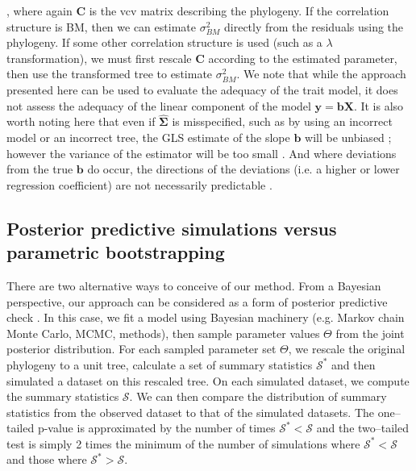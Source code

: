 \documentclass[12pt]{article}
\begin{document}
\citep{ThomasFreckleton, others}, where again $\mathbf{C}$ is the vcv matrix describing the phylogeny. If the correlation structure is BM, then we can estimate $\sigma^2_{BM}$ directly from the residuals using the phylogeny. If some other correlation structure is used (such as a $\lambda$ transformation), we must first rescale $\mathbf{C}$ according to the estimated parameter, then use the transformed tree to estimate $\sigma^2_{BM}$. We note that while the approach presented here can be used to evaluate the adequacy of the trait model, it does not assess the adequacy of the linear component of the model $\mathbf{y} = \mathbf{b}\mathbf{X}$. It is also worth noting here that even if $\hat{\mathbf{\Sigma}}$ is misspecified, such as by using an incorrect model or an incorrect tree, the GLS estimate of the slope $\mathbf{b}$ will be unbiased \citep{Rao1999}; however the variance of the estimator will be too small \citep{Rohlf2006}. And where deviations from the true $\mathbf{b}$ do occur, the directions of the deviations (i.e. a higher or lower regression coefficient) are not necessarily predictable \citep{Rohlf2006}.

\subsection*{Posterior predictive simulations versus parametric bootstrapping}
There are two alternative ways to conceive of our method. From a Bayesian perspective, our approach can be considered as a form of posterior predictive check \citep{Rubin1984, Gelman1996, Gelman2003}. In this case, we fit a model using Bayesian machinery (e.g. Markov chain Monte Carlo, MCMC, methods), then sample parameter values $\Theta$ from the joint posterior distribution. For each sampled parameter set $\Theta$, we rescale the original phylogeny to a unit tree, calculate a set of summary statistics $\mathcal{S}^*$ and then simulated a dataset on this rescaled tree. On each simulated dataset, we compute the summary statistics $\mathcal{S}$. We can then compare the distribution of summary statistics from the observed dataset to that of the simulated datasets. The one--tailed p-value is approximated by the number of times $\mathcal{S}^* < \mathcal{S}$ and the two--tailed test is simply 2 times the minimum of the number of simulations where $\mathcal{S}^* < \mathcal{S}$ and those where $\mathcal{S}^* > \mathcal{S}$.
\end{document}
